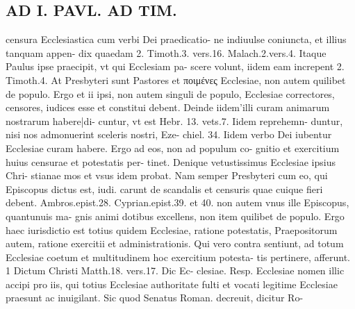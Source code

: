 \documentclass{article}
\begin{document}
\begin{pages}
\section*{AD I. PAVL. AD TIM. }
\marginpar{[ p.446 ]}\pstart censura Ecclesiastica cum verbi Dei praedicatio- ne indiuulse coniuncta, et illius tanquam appen- dix quaedam 2. Timoth.3. vers.16. Malach.2.vers.4. Itaque Paulus ipse praecipit, vt qui Ecclesiam pa- scere volunt, iidem eam increpent 2. Timoth.4. At Presbyteri sunt Pastores et ποιμένες Ecclesiae, non autem quilibet de populo. Ergo et ii ipsi, non autem singuli de populo, Ecclesiae correctores, censores, iudices esse et constitui debent. Deinde iidem’illi curam animarum nostrarum habere|di- cuntur, vt est Hebr. 13. vets.7. Iidem reprehemn- duntur, nisi nos admonuerint sceleris nostri, Eze- chiel. 34. Iidem verbo Dei iubentur Ecclesiae curam habere. Ergo ad eos, non ad populum co- gnitio et exercitium huius censurae et potestatis per- tinet. Denique vetustissimus Ecclesiae ipsius Chri- stianae mos et vsus idem probat. Nam semper Presbyteri cum eo, qui Episcopus dictus est, iudi. carunt de scandalis et censuris quae cuique fieri debent. Ambros.epist.28. Cyprian.epist.39. et 40. non autem vnus ille Episcopus, quantunuis ma- gnis animi dotibus excellens, non item quilibet de populo. Ergo haec iurisdictio est totius quidem Ecclesiae, ratione potestatis, Praepositorum autem, ratione exercitii et administrationis. Qui vero contra sentiunt, ad totum Ecclesiae coetum et multitudinem hoc exercitium potesta- tis pertinere, afferunt. 1 Dictum Christi Matth.18. vers.17. Dic Ec- clesiae. Resp. Ecclesiae nomen illic accipi pro iis, qui totius Ecclesiae authoritate fulti et vocati legitime Ecclesiae praesunt ac inuigilant. Sic quod Senatus Roman. decreuit, dicitur Ro-  \pend

\end{pages}
\end{document}
